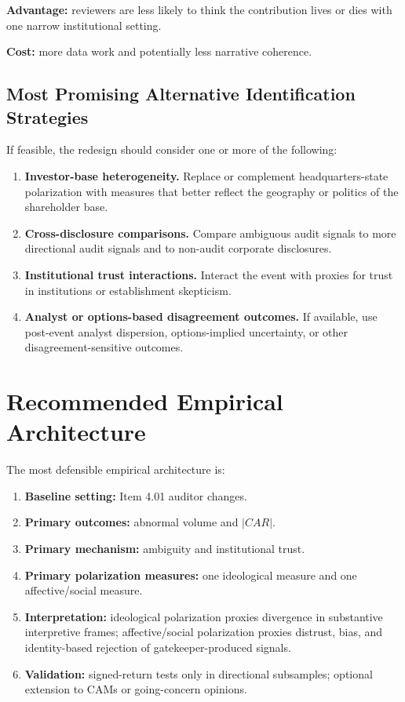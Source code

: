 \documentclass[12pt]{article}
\begin{document}
\textbf{Advantage:} reviewers are less likely to think the contribution lives or dies with one narrow institutional setting.

\textbf{Cost:} more data work and potentially less narrative coherence.

\subsection{Most Promising Alternative Identification Strategies}

If feasible, the redesign should consider one or more of the following:

\begin{enumerate}[label=\textbf{I\arabic*.}]
    \item \textbf{Investor-base heterogeneity.} Replace or complement headquarters-state polarization with measures that better reflect the geography or politics of the shareholder base.
    \item \textbf{Cross-disclosure comparisons.} Compare ambiguous audit signals to more directional audit signals and to non-audit corporate disclosures.
    \item \textbf{Institutional trust interactions.} Interact the event with proxies for trust in institutions or establishment skepticism.
    \item \textbf{Analyst or options-based disagreement outcomes.} If available, use post-event analyst dispersion, options-implied uncertainty, or other disagreement-sensitive outcomes.
\end{enumerate}

\section{Recommended Empirical Architecture}

The most defensible empirical architecture is:

\begin{enumerate}[label=\textbf{E\arabic*.}]
    \item \textbf{Baseline setting:} Item 4.01 auditor changes.
    \item \textbf{Primary outcomes:} abnormal volume and $|CAR|$.
    \item \textbf{Primary mechanism:} ambiguity and institutional trust.
    \item \textbf{Primary polarization measures:} one ideological measure and one affective/social measure.
    \item \textbf{Interpretation:} ideological polarization proxies divergence in substantive interpretive frames; affective/social polarization proxies distrust, bias, and identity-based rejection of gatekeeper-produced signals.
    \item \textbf{Validation:} signed-return tests only in directional subsamples; optional extension to CAMs or going-concern opinions.
\end{enumerate}
\end{document}
